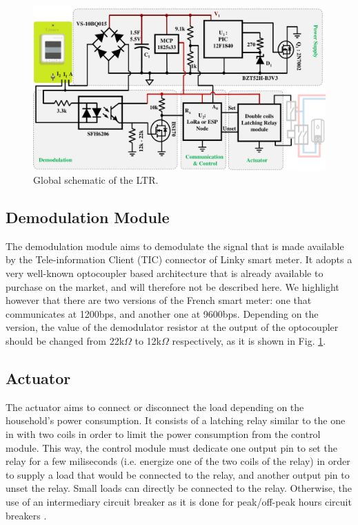 \documentclass[conference]{IEEEtran}
\begin{document}
\begin{figure}[h]
	\centering
	\includegraphics[width=1\columnwidth]{Images/schematic.pdf}
	\caption{Global schematic of the LTR.}
	\label{Fig:schematic}
\end{figure}



\subsection{Demodulation Module}
The demodulation module aims to demodulate the signal that is made available by the Tele-information Client (TIC) connector of Linky smart meter. It adopts a very well-known optocoupler based architecture that is already available to purchase on the market, and will therefore not be described here. We highlight however that there are two versions of the French smart meter: one that communicates at 1200bps, and another one at 9600bps. Depending on the version, the value of the demodulator resistor at the output of the optocoupler should be changed from 22k$\Omega$ to 12k$\Omega$ respectively, as it is shown in Fig. \ref{Fig:schematic}. 

\subsection{Actuator}
The actuator aims to connect or disconnect the load depending on the household's power consumption. It consists of a latching relay similar to the one in \cite{adafruit:latchingrelay} with two coils in order to limit the power consumption from the control module. This way, the control module must dedicate one output pin to set the relay for a few miliseconds (i.e. energize one of the two coils of the relay) in order to supply a load that would be connected to the relay, and another output pin to unset the relay. Small loads can directly be connected to the relay. Otherwise, the use of an intermediary circuit breaker as it is done for peak/off-peak hours circuit breakers \cite{schneider:circuitbreaker}.
\end{document}
